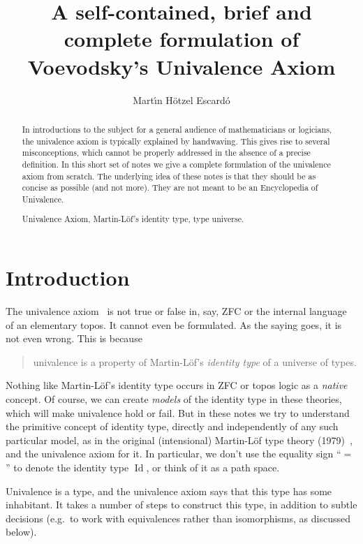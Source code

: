 \documentclass{article}
\title{A self-contained, brief and complete formulation of Voevodsky's Univalence Axiom}
\author{Mart{\'\i}n H\"otzel Escard\'o}
\newcommand{\Id}{\operatorname{Id}}
\begin{document}
\maketitle

\begin{abstract}
  In introductions to the subject for a general audience of
  mathematicians or logicians, the univalence axiom is typically
  explained by handwaving. This gives rise to several misconceptions,
  which cannot be properly addressed in the absence of a precise
  definition. In this short set of notes we give a complete
  formulation of the univalence axiom from scratch. The underlying
  idea of these notes is that they should be as concise as possible
  (and not more). They are not meant to be an Encyclopedia of
  Univalence.

  \medskip {} Univalence Axiom, Martin-L\"of's identity type, type universe.
\end{abstract}

\section{Introduction}

The univalence axiom~\cite{unimath,hottbook,grayson} is not true or false
in, say, ZFC or the internal language of an elementary topos. It
cannot even be formulated. As the saying goes, it is not even wrong.
%
This is because
\begin{quote}
   univalence is a property of Martin-L\"of's \emph{identity type}
   of a universe of types.
\end{quote}
Nothing like Martin-L\"of's identity type occurs in ZFC or topos logic
as a \emph{native} concept. Of course, we can create \emph{models} of
the identity type in these theories, which will make univalence hold
or fail. But in these notes we try to understand the primitive concept
of identity type, directly and independently of any such particular
model, as in the original (intensional) Martin-L\"of type theory
(1979)~\cite{MR682410}, and the univalence axiom for it. In
particular, we don't use the equality sign ``$=$'' to denote the
identity type $\Id$, or think of it as a path space.


Univalence is a type, and the univalence axiom says that this type has
some inhabitant. It takes a number of steps to construct this type, in
addition to subtle decisions (e.g.\ to work with equivalences rather
than isomorphisms, as discussed below).
\end{document}
